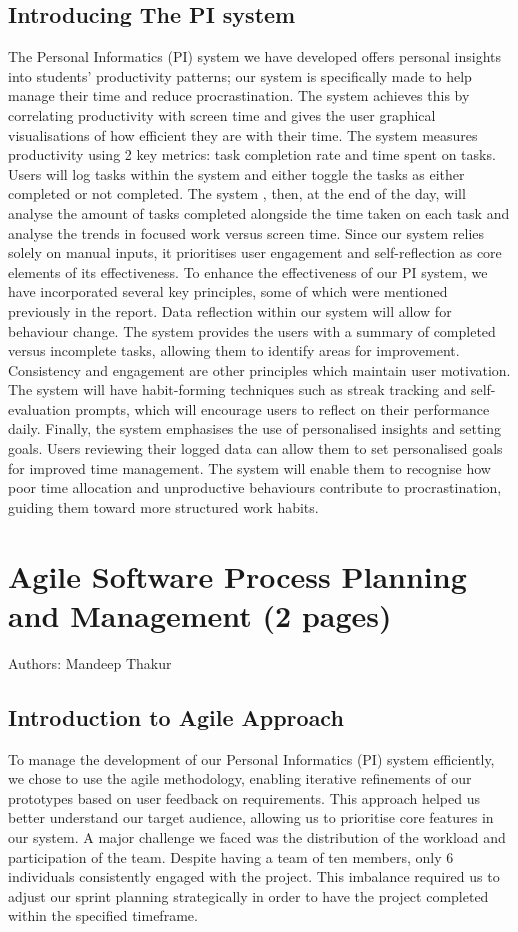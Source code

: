 \documentclass[12pt,a4paper]{article}
\begin{document}
\subsection{Introducing The PI system}
The Personal Informatics (PI) system we have developed offers personal insights into students' productivity patterns; our system is specifically made to help manage their time and reduce procrastination. The system achieves this by correlating productivity with screen time and gives the user graphical visualisations of how efficient they are with their time. The system measures productivity using 2 key metrics: task completion rate and time spent on tasks. Users will log tasks within the system and either toggle the tasks as either completed or not completed. The system , then, at the end of the day, will analyse the amount of tasks completed alongside the time taken on each task and analyse the trends in focused work versus screen time. Since our system relies solely on manual inputs, it prioritises user engagement and self-reflection as core elements of its effectiveness. To enhance the effectiveness of our PI system, we have incorporated several key principles, some of which were mentioned previously in the report. Data reflection within our system will allow for behaviour change. The system provides the users with a summary of completed versus incomplete tasks, allowing them to identify areas for improvement. Consistency and engagement are other principles which maintain user motivation. The system will have habit-forming techniques such as streak tracking and self-evaluation prompts, which will encourage users to reflect on their performance daily. Finally, the system emphasises the use of personalised insights and setting goals. Users reviewing their logged data can allow them to set personalised goals for improved time management. The system will enable them to recognise how poor time allocation and unproductive behaviours contribute to procrastination, guiding them toward more structured work habits.



\label{sec:intro}


\section{Agile Software Process Planning and Management (2 pages)}
Authors: Mandeep Thakur
\subsection{Introduction to Agile Approach}
To manage the development of our Personal Informatics (PI) system efficiently, we chose to use the agile methodology, enabling iterative refinements of our prototypes based on user feedback on requirements. This approach helped us better understand our target audience, allowing us to prioritise core features in our system. A major challenge we faced was the distribution of the workload and participation of the team. Despite having a team of ten members, only 6 individuals consistently engaged with the project. This imbalance required us to adjust our sprint planning strategically in order to have the project completed within the specified timeframe.
\end{document}
